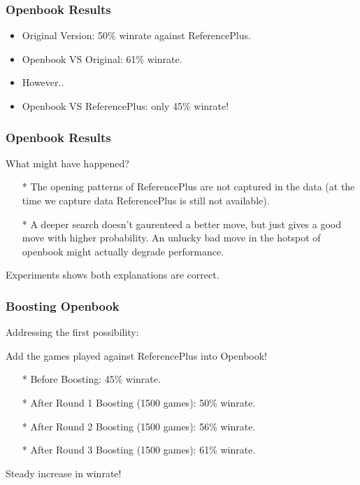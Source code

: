 \documentclass[10pt]{beamer}
\begin{document}
	\begin{frame}
		\frametitle{Openbook Results}
		
		\begin{itemize}
		\item Original Version: \textcolor{fgreen}{50\%} winrate against ReferencePlus.\pause
		\item Openbook VS Original: \textcolor{fgreen}{61\%} winrate.\pause
		\item However..\pause
		\item Openbook VS ReferencePlus: only \textcolor{dred}{45\%} winrate!
		\end{itemize}
	\end{frame}
	
	\begin{frame}
		\frametitle{Openbook Results}
		
		What might have happened?\pause
		
		\begin{itemize}
		\item[*] The opening patterns of ReferencePlus are not captured in the data 
		(at the time we capture data ReferencePlus is still not available).\pause
		\item[*] A deeper search doesn't gaurenteed a better move, but just gives a good move with higher probability. 
		An unlucky bad move in the hotspot of openbook might actually degrade performance.\pause
		\end{itemize}
		
		Experiments shows \textcolor{fgreen}{both} explanations are correct.
	\end{frame}
	
	\begin{frame}
		\frametitle{Boosting Openbook}
		
		Addressing the first possibility:\pause
		
		\textcolor{fgreen}{Add the games played against ReferencePlus into Openbook!}\pause
		
		\begin{itemize}
		\item[*] Before Boosting: \textcolor{dred}{45\%} winrate.\pause
		\item[*] After Round 1 Boosting (1500 games): \textcolor{fgreen}{50\%} winrate.\pause
		\item[*] After Round 2 Boosting (1500 games): \textcolor{fgreen}{56\%} winrate.\pause
		\item[*] After Round 3 Boosting (1500 games): \textcolor{fgreen}{61\%} winrate.\pause
		\end{itemize}
		
		Steady increase in winrate!
	\end{frame}
	
\end{document}
